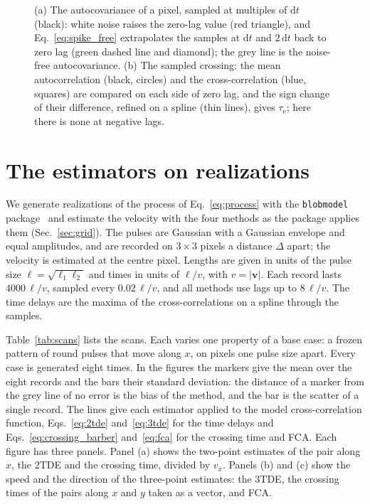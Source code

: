 \documentclass[aps,pre,11pt,a4paper,preprint,amsmath,amssymb,groupedaddress]{revtex4-2}
\newcommand{\Eqref}[1]{Eq.~\eqref{#1}}
\newcommand{\Eqsref}[2]{Eqs.~\eqref{#1} and~\eqref{#2}}
\newcommand{\Tabref}[1]{Table~\ref{#1}}
\newcommand{\Secref}[1]{Sec.~\ref{#1}}
\newcommand{\abs}[1]{{\left|#1\right|}}
\newcommand{\rmd}{\text{d}}
\newcommand{\bv}{\ensuremath{\bm{v}}}
\newcommand{\bD}{\ensuremath{\bm{\Delta}}}
\newcommand{\taue}{\ensuremath{\tau_\text{e}}}
\newcommand{\code}[1]{\texttt{#1}}
\begin{document}
\begin{figure}
\caption{(a) The autocovariance of a pixel, sampled at multiples of $\rmd t$ (black): white noise raises the zero-lag value (red triangle), and \Eqref{eq:spike_free} extrapolates the samples at $\rmd t$ and $2\,\rmd t$ back to zero lag (green dashed line and diamond); the grey line is the noise-free autocovariance. (b) The sampled crossing: the mean autocorrelation (black, circles) and the cross-correlation (blue, squares) are compared on each side of zero lag, and the sign change of their difference, refined on a spline (thin lines), gives \taue; here there is none at negative lags.}
\label{fig:data}
\end{figure}

\section{The estimators on realizations}
\label{sec:realizations}

We generate realizations of the process of \Eqref{eq:process} with the \code{blobmodel} package~\cite{losada_blobmodel_2025} and estimate the velocity with the four methods as the package applies them (\Secref{sec:grid}). The pulses are Gaussian with a Gaussian envelope and equal amplitudes, and are recorded on $3\times3$ pixels a distance $\Delta$ apart; the velocity is estimated at the centre pixel. Lengths are given in units of the pulse size $\ell = \sqrt{\ell_1\ell_2}$ and times in units of $\ell/v$, with $v = \abs{\bv}$. Each record lasts $4000\,\ell/v$, sampled every $0.02\,\ell/v$, and all methods use lags up to $8\,\ell/v$. The time delays are the maxima of the cross-correlations on a spline through the samples.

\Tabref{tab:scans} lists the scans. Each varies one property of a base case: a frozen pattern of round pulses that move along $x$, on pixels one pulse size apart. Every case is generated eight times. In the figures the markers give the mean over the eight records and the bars their standard deviation: the distance of a marker from the grey line of no error is the bias of the method, and the bar is the scatter of a single record. The lines give each estimator applied to the model cross-correlation function, \Eqsref{eq:2tde}{eq:3tde} for the time delays and \Eqsref{eq:crossing_barber}{eq:fca} for the crossing time and FCA. Each figure has three panels. Panel (a) shows the two-point estimates of the pair along $x$, the 2TDE and the crossing time, divided by $v_x$. Panels (b) and (c) show the speed and the direction of the three-point estimates: the 3TDE, the crossing times of the pairs along $x$ and $y$ taken as a vector, and FCA.
\end{document}
